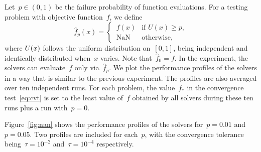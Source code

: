 \documentclass[
    smallextended,  %
    final,          %
]{svjour3}
\newcommand{\iter}[1][k]{x\ifthenelse{\equal{#1}{}}{}{_{#1}}}
\newcommand{\obj}{f}
\begin{document}
Let~$p \in (0,1)$ be the failure probability of function evaluations.
For a testing problem with objective function~$\obj$, we define
\begin{equation}
    \label{eq:nan-obj}
    \hat{\obj}_p(x) = \begin{cases}
        \,\obj(x) & \text{if~$U(x) \ge  p$}, \\[0.5ex]
        \,\text{NaN} & \text{otherwise},
    \end{cases}
\end{equation}
where $U(\iter[])$ follows the uniform distribution on~$[0,1]$, being independent and identically distributed when~$x$ varies.
Note that~$\hat{\obj}_0 = f$.
In the experiment, the solvers can evaluate~$\obj$ only via~$\hat{\obj}_p$.
We plot the performance profiles of the solvers in a way that is similar to the previous experiment.
The profiles are also averaged over ten independent runs. For each problem, the
value~$\obj_{\ast}$ in the convergence test~\eqref{eq:cvt} is set to the least value of~$\obj$ obtained
by all solvers during these ten runs plus a run with~$p = 0$.

Figure~\ref{fig:nan} shows the performance profiles of the solvers for~$p = 0.01$ and~$p=0.05$.
Two profiles are included for each~$p$, with the convergence tolerance being~$\tau = 10^{-2}$ and~$\tau = 10^{-4}$ respectively.
\end{document}
